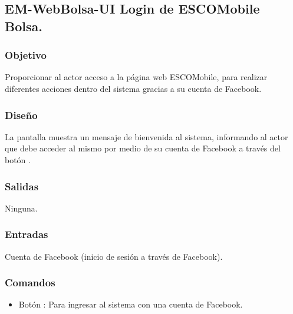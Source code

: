 



\subsection{EM-WebBolsa-UI Login de ESCOMobile Bolsa.}

\subsubsection{Objetivo}
	\noindent
	Proporcionar al actor acceso a la página web ESCOMobile, para realizar diferentes acciones dentro del sistema gracias a su cuenta de Facebook.

\subsubsection{Diseño}
	\noindent
	La pantalla muestra un mensaje de bienvenida al sistema, informando al actor que debe acceder al mismo por medio de su cuenta de Facebook a través del botón .

\pagebreak	
{}

\subsubsection{Salidas}
	\noindent
	Ninguna.

\subsubsection{Entradas}
	\noindent
	Cuenta de Facebook (inicio de sesión a través de Facebook).

\subsubsection{Comandos}
	\begin{itemize}
		\item Botón : Para ingresar al sistema con una cuenta de Facebook.
	\end{itemize}

